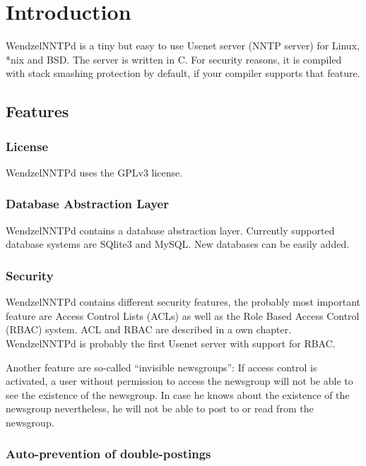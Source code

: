 \chapter{Introduction}

WendzelNNTPd is a tiny but easy to use Usenet server (NNTP server) for Linux, *nix and BSD. The server is written in C. For security reasons, it is compiled with stack smashing protection by default, if your compiler supports that feature.

\section{Features}

\subsection{License}

WendzelNNTPd uses the GPLv3 license.

\subsection{Database Abstraction Layer}

WendzelNNTPd contains a database abstraction layer. Currently supported database systems are SQlite3 and MySQL. New databases can be easily added.

\subsection{Security}

WendzelNNTPd contains different security features, the probably most important feature are Access Control Lists (ACLs) as well as the Role Based Access Control (RBAC) system. ACL and RBAC are described in a own chapter. WendzelNNTPd is probably the first Usenet server with support for RBAC.

Another feature are so-called ``invisible newsgroups'': If access control is activated, a user without permission to access the newsgroup will not be able to see the existence of the newsgroup. In case he knows about the existence of the newsgroup nevertheless, he will not be able to post to or read from the newsgroup.

\subsection{Auto-prevention of double-postings}

